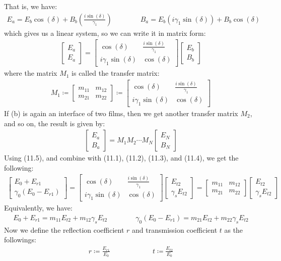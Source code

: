 \documentclass[11pt]{book}
\theoremstyle{break}
\theoremstyle{break}
\newcommand{\bmat}[1]{\begin{bmatrix} #1 \end{bmatrix}}
\begin{document}
That is, we have:
\begin{align*}
E_a = E_b \cos(\delta)+B_b \left( \frac{i\sin(\delta)}{\gamma_1}\right) \qquad\qquad B_a = E_b\left(i\gamma_1 \sin(\delta)\right)+ B_b \cos(\delta)
\end{align*}
which gives us a linear system, so we can write it in matrix form:
\begin{align}
\bmat{E_a \\ E_a} = \bmat{\cos(\delta) & \frac{i\sin(\delta)}{\gamma_1} \\ i\gamma_1 \sin(\delta) & \cos(\delta)} \bmat{E_b \\ B_b}
\end{align}
where the matrix $M_1$ is called the transfer matrix:
\begin{align*}
M_1\coloneqq \bmat{m_{11}& m_{12} \\ m_{21} & m_{22}}\coloneqq \bmat{\cos(\delta) & \frac{i\sin(\delta)}{\gamma_1} \\ i\gamma_1 \sin(\delta) & \cos(\delta)}
\end{align*}
If (b) is again an interface of two films, then we get another transfer matrix $M_2$, and so on, the result is given by:
\begin{align*}
\bmat{E_a \\ B_a} = M_1 M_2 \cdots M_N \bmat{E_N \\ B_N}
\end{align*}
Using (11.5), and combine with (11.1), (11.2), (11.3), and (11.4), we get the following:
\begin{align*}
\bmat{E_0 + E_{r1} \\ \gamma_0 (E_0 - E_{r1})} = \bmat{\cos(\delta) & \frac{i\sin(\delta)}{\gamma_1} \\ i\gamma_1 \sin(\delta) & \cos(\delta)}\bmat{E_{t2} \\ \gamma_s E_{t2}} = \bmat{m_{11}& m_{12} \\ m_{21} & m_{22}}\bmat{E_{t2} \\ \gamma_s E_{t2}}
\end{align*}
Equivalently, we have:
\begin{align}
E_{0}+E_{r1} = m_{11} E_{t2} + m_{12}\gamma_s E_{t2} \qquad\qquad \gamma_0(E_0 - E_{r1}) = m_{21}E_{t2} + m_{22}\gamma_s E_{t2}
\end{align}
Now we define the reflection coefficient $r$ and transmission coefficient $t$ as the followings:
\begin{align*}
r \coloneqq \frac{E_{r1}}{E_0} \qquad\qquad \qquad t\coloneqq \frac{E_{t2}}{E_0}
\end{align*}
\end{document}
